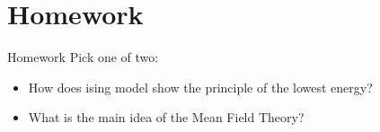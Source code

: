 
\section*{Homework}

\begin{frame}{Homework}
	Pick one of two:
	\begin{itemize}
		\item How does ising model show the principle of the lowest energy?
		\item What is the main idea of the Mean Field Theory?
	\end{itemize}
\end{frame}
